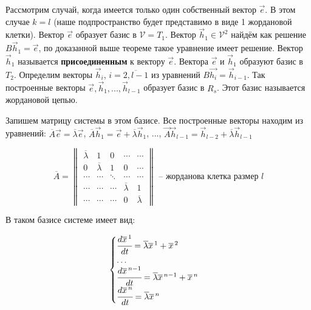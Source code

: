 Рассмотрим случай, когда имеется только один собственный вектор $\overrightarrow{e}$. В этом случае $k = l$ (наше подпространство будет представимо в виде 1 жордановой клетки). 
Вектор $\overrightarrow{e}$ образует базис в $\mathcal{V} = T_1$. Вектор $\overrightarrow{h}_1 \in \mathcal{V}^2$ найдём как решение $B \overrightarrow{h}_1 = \overrightarrow{e}$, по доказанной выше теореме такое уравнение имеет решение. 
Вектор $\overrightarrow{h}_1$ называется \textbf{присоединенным} к вектору $\overrightarrow{e}$. Вектора $\overrightarrow{e}$ и $\overrightarrow{h}_1$ образуют базис в $T_2$. 
Определим векторы $\overrightarrow{h}_i$, $i = \overline{2, l-1}$ из уравнений $B \overrightarrow{h_i} = \overrightarrow{h}_{i-1}$. Так построенные векторы $\overrightarrow{e}, \overrightarrow{h}_1, ..., \overrightarrow{h}_{l-1}$ образует базис в $R_s$. 
Этот базис называется жордановой цепью.

Запишем матрицу системы в этом базисе. Все построенные векторы находим из уравнений: 
$\overline{A}\overrightarrow{e} = \overline{\lambda} \overrightarrow{e}$, $\overline{A} \overrightarrow{h}_1 = \overrightarrow{e} + \overline{\lambda} \overrightarrow{h}_1$, ..., $\overrightarrow{A} \overrightarrow{h}_{l-1} = \overrightarrow{h}_{l-2} + \overline{\lambda} \overrightarrow{h}_{l-1}$

\[ \overline{A} = \begin{Vmatrix*} \overline{\lambda} & 1 & 0 & \cdots & \cdots \\
                              0 & \overline{\lambda} & 1 & 0 & \cdots     \\
                              \cdots & \cdots & \ddots & \cdots & \cdots \\
                              \cdots & \cdots & \cdots & \overline{\lambda} & 1 \\ 
                              \cdots & \cdots & \cdots & 0 & \overline{\lambda} 
             \end{Vmatrix*} \text{ -- жорданова клетка размер $l$}
             \]

В таком базисе системе имеет вид:

\begin{equation}
 \begin{cases}
   \cfrac{d \overline{x}^{\,1}}{dt} = \overline{\lambda} \overline{x}^{\,1} + \overline{x}^{\,2} \\
   \ldots \\
   \cfrac{d \overline{x}^{\,n-1}}{dt} = \overline{\lambda} \overline{x}^{\,n-1} + \overline{x}^{\,n} \\
   \cfrac{d \overline{x}^{\,n}}{dt} = \overline{\lambda} \overline{x}^{\,n} \\
 \end{cases} 
\end{equation}


